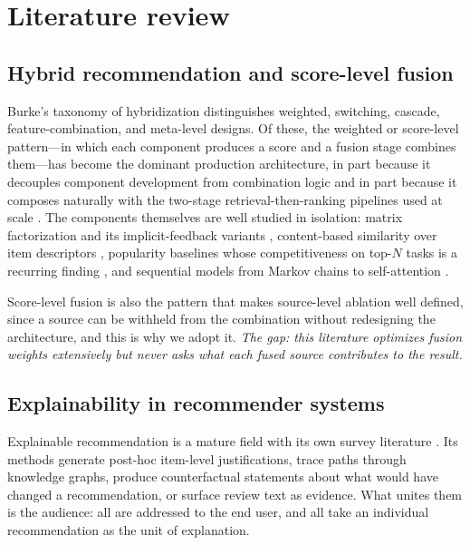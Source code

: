 \documentclass[pdflatex,sn-mathphys-num]{sn-jnl}%
\theoremstyle{thmstyleone}%
\theoremstyle{thmstyletwo}%
\theoremstyle{thmstylethree}%
\begin{document}
\section{Literature review}\label{sec2}

\subsection{Hybrid recommendation and score-level fusion}\label{subsec2_1}

Burke's taxonomy of hybridization \cite{burke2002} distinguishes weighted, switching, cascade, feature-combination, and meta-level designs. Of these, the weighted or score-level pattern---in which each component produces a score and a fusion stage combines them---has become the dominant production architecture, in part because it decouples component development from combination logic and in part because it composes naturally with the two-stage retrieval-then-ranking pipelines used at scale \cite{covington2016}. The components themselves are well studied in isolation: matrix factorization and its implicit-feedback variants \cite{koren2009,rendle2009}, content-based similarity over item descriptors \cite{salton1988}, popularity baselines whose competitiveness on top-$N$ tasks is a recurring finding \cite{cremonesi2010}, and sequential models from Markov chains \cite{rendle2010} to self-attention \cite{kang2018}.

Score-level fusion is also the pattern that makes source-level ablation well defined, since a source can be withheld from the combination without redesigning the architecture, and this is why we adopt it. \emph{The gap: this literature optimizes fusion weights extensively but never asks what each fused source contributes to the result.}

\subsection{Explainability in recommender systems}\label{subsec2_2}

Explainable recommendation is a mature field with its own survey literature \cite{zhang2020}. Its methods generate post-hoc item-level justifications, trace paths through knowledge graphs, produce counterfactual statements about what would have changed a recommendation, or surface review text as evidence. What unites them is the audience: all are addressed to the end user, and all take an individual recommendation as the unit of explanation.
\end{document}
